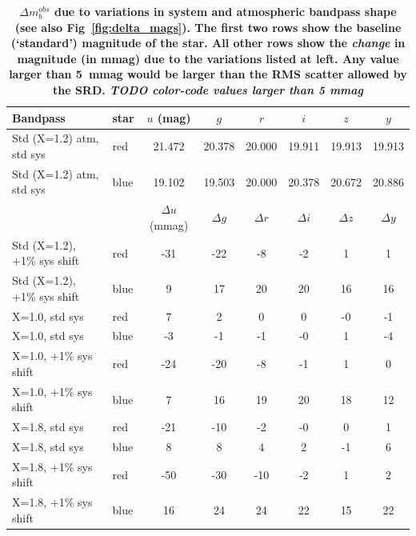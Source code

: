 \documentclass[12pt,preprint]{aastex}
\begin{document}
\begin{center}
\begin{table}[htb]
\caption{{\bf $\Delta m_b^{obs}$ due to variations in system and atmospheric
 bandpass shape (see also Fig~\ref{fig:delta_mags}). The first two
rows show the baseline (`standard') magnitude of the star. All other rows show the 
{\it change} in magnitude (in mmag) due to the variations listed at
left. Any value larger than 5~mmag would be larger than the RMS
scatter allowed by the SRD. {\it TODO color-code values larger than 5 mmag}} }
\begin{tabular}{l l | c c c c c c}
Bandpass & star &  $u$ (mag) & $g$ & $r$ & $i$ & $z$ & $y$ \\ \hline
Std (X=1.2) atm, std sys  &  red & 21.472 & 20.378 & 20.000 & 19.911 & 19.913 & 19.913 \\
Std (X=1.2) atm, std sys  &  blue & 19.102 & 19.503 & 20.000 & 20.378 & 20.672 & 20.886 \\ \hline \hline
 & & $\Delta u$ (mmag) & $\Delta g$  & $\Delta r$  & $\Delta i$ & $\Delta z$  & $\Delta y$ \\ \hline
Std (X=1.2), +1\% sys shift & red  & -31 & -22 & -8 & -2 & 1 & 1 \\
Std (X=1.2), +1\% sys shift & blue  & 9 & 17 & 20 & 20 & 16 & 16 \\ \hline
X=1.0, std sys & red  & 7 & 2 & 0 & 0 & -0 & -1 \\
X=1.0, std sys & blue  & -3 & -1 & -1 & -0 & 1 & -4 \\ \hline
X=1.0, +1\% sys shift & red & -24 & -20 & -8 & -1 & 1 & 0 \\
X=1.0, +1\% sys shift & blue & 7 & 16 & 19 & 20 & 18 & 12 \\ \hline
X=1.8, std sys  & red & -21 & -10 & -2 & -0 & 0 & 1 \\
X=1.8, std sys  & blue & 8 & 8 & 4 & 2 & -1 & 6 \\ \hline
X=1.8, +1\% sys shift & red & -50 & -30 & -10 & -2 & 1 & 2 \\
X=1.8, +1\% sys shift & blue & 16 & 24 & 24 & 22 & 15 & 22 \\ \hline
\end{tabular}
\label{tab:delta_mags}
\end{table}
\end{center}

\clearpage
\end{document}
